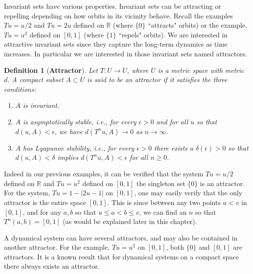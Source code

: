 \documentclass[a4paper,12pt,twoside]{report}
\newtheorem{Definition}{Definition}[]
\begin{document}
Invariant sets have various properties. Invariant sets can be attracting or repelling depending on how orbits in its vicinity behave. 
Recall the examples $Tu =u/2$ and $Tu=2u$ defined on $\mathbb{R}$ (where $\{0\}$ ``attracts" orbits) or the example, $Tu=u^2$ defined on $[0,1]$ (where $\{1\}$ ``repels" orbits). We are interested in attractive invariant sets since they capture the long-term dynamics as time increases. 
In particular we are interested in those invariant sets named attractors.

\begin{Definition}
  [\bf Attractor]\label{Dfn_Attractor}\rm
  Let $T: U \to U$, where $U$  is a metric space with metric $d$. A compact subset $A \subset U$ is said to be an attractor if it satisfies the three conditions: 
  \vspace{-8mm}
  \begin{enumerate}
	\item $A$ is invariant. 
	\item $A$ is asymptotically stable, i.e., for every $\epsilon > 0$ and for all $u$ so that $d(u,A) < \epsilon$, we have $d(T^nu,A) \to 0$ as $n\to \infty$. 
	\item $A$ has Lyapunov stability, i.e., for every $\epsilon > 0$  there exists a $\delta(\epsilon) > 0$ so that $d(u,A) < \delta$ implies $d(T^nu,A) < \epsilon$ for all $n\ge 0$.  
\end{enumerate}
\end{Definition} 

Indeed in our previous examples, it can be verified that the system  $Tu=u/2$ defined on  $\mathbb{R}$ and $Tu=u^2$ defined on $[0,1]$  the singleton set $\{0\}$ is an attractor.  For the system,  $Tu=1-|2u-1|$ on $[0,1]$, one may easily verify that the only attractor is the entire space $[0,1]$. This is since between any two points $u< v$ in $[0,1]$, and for any $a,b$ so that $u\le a < b \le v$, we can find an $n$ so that $T^n(a,b)=[0,1]$ (as would be explained later in this chapter). 


A dynamical system can have several attractors, and may also be contained in another attractor. For the example, $Tu =u^2$ on $[0,1]$, both $\{0\}$ and $[0,1]$ are attractors. It is a known result that for dynamical systems on a compact space there always exists an attractor. 
\end{document}
